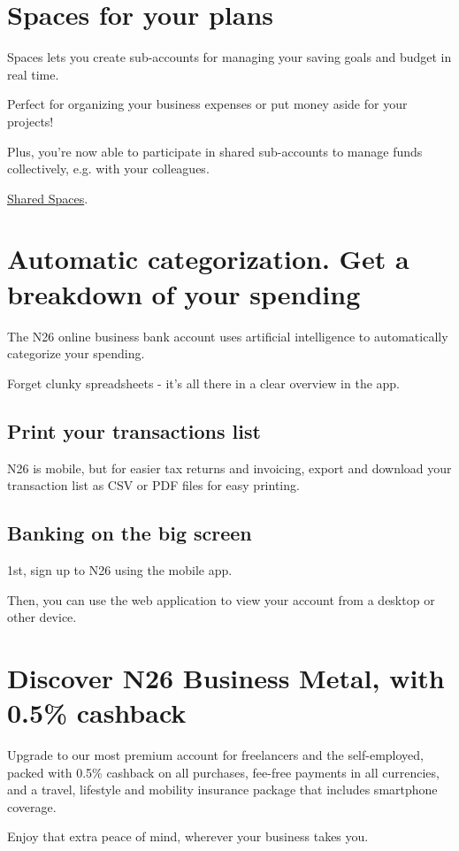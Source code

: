 \documentclass[onsided]{book}
\numberwithin{equation}{section}
\begin{document}
\section{Spaces for your plans}
Spaces lets you create sub-accounts for managing your saving goals and budget in real time.

Perfect for organizing your business expenses or put money aside for your projects!

Plus, you're now able to participate in shared sub-accounts to manage funds collectively, e.g. with your colleagues.

\href{https://n26.com/en-eu/shared-spaces-bank-account}{Shared Spaces}.

\section{Automatic categorization. Get a breakdown of your spending}
The N26 online business bank account uses artificial intelligence to automatically categorize your spending.

Forget clunky spreadsheets - it's all there in a clear overview in the app.

\subsection{Print your transactions list}
N26 is mobile, but for easier tax returns and invoicing, export and download your transaction list as CSV or PDF files for easy printing.

\subsection{Banking on the big screen}
1st, sign up to N26 using the mobile app.

Then, you can use the web application to view your account from a desktop or other device.

\section{Discover N26 Business Metal, with 0.5\% cashback}
Upgrade to our most premium account for freelancers and the self-employed, packed with 0.5\% cashback on all purchases, fee-free payments in all currencies, and a travel, lifestyle and mobility insurance package that includes smartphone coverage.

Enjoy that extra peace of mind, wherever your business takes you.
\end{document}
